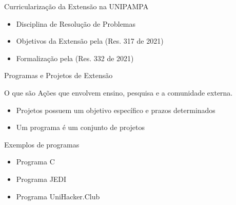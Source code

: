 \begin{frame}{{\sffamily Curricularização da Extensão na UNIPAMPA}}
\begin{block}{}
    \begin{itemize}
        \item Disciplina de Resolução de Problemas
        \item Objetivos da Extensão pela (Res. 317 de 2021)
        \item Formalização pela (Res. 332 de 2021)
    \end{itemize}   

\end{block}
\end{frame}

\begin{frame}{{\sffamily Programas e Projetos de Extensão}}
\begin{block}{O que são}
Ações que envolvem ensino, pesquisa e a comunidade externa.
\begin{itemize}
    \item Projetos possuem um objetivo específico e prazos determinados %
    \item Um programa é um conjunto de projetos
\end{itemize}
\end{block}

\begin{block}{Exemplos de programas}
\begin{itemize}
    \item Programa C %
    \item Programa JEDI %
    \item Programa UniHacker.Club %
\end{itemize}
\end{block}

\end{frame}

